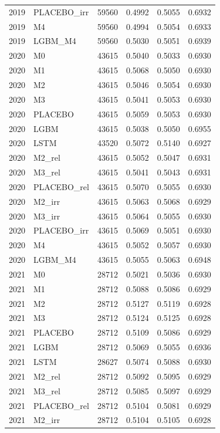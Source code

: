 \begin{tabular}{llrrrr}
2019 & PLACEBO\_irr & 59560 & 0.4992 & 0.5055 & 0.6932 \\
2019 & M4 & 59560 & 0.4994 & 0.5054 & 0.6933 \\
2019 & LGBM\_M4 & 59560 & 0.5030 & 0.5051 & 0.6939 \\
2020 & M0 & 43615 & 0.5040 & 0.5033 & 0.6930 \\
2020 & M1 & 43615 & 0.5068 & 0.5050 & 0.6930 \\
2020 & M2 & 43615 & 0.5046 & 0.5054 & 0.6930 \\
2020 & M3 & 43615 & 0.5041 & 0.5053 & 0.6930 \\
2020 & PLACEBO & 43615 & 0.5059 & 0.5053 & 0.6930 \\
2020 & LGBM & 43615 & 0.5038 & 0.5050 & 0.6955 \\
2020 & LSTM & 43520 & 0.5072 & 0.5140 & 0.6927 \\
2020 & M2\_rel & 43615 & 0.5052 & 0.5047 & 0.6931 \\
2020 & M3\_rel & 43615 & 0.5041 & 0.5043 & 0.6931 \\
2020 & PLACEBO\_rel & 43615 & 0.5070 & 0.5055 & 0.6930 \\
2020 & M2\_irr & 43615 & 0.5063 & 0.5068 & 0.6929 \\
2020 & M3\_irr & 43615 & 0.5064 & 0.5055 & 0.6930 \\
2020 & PLACEBO\_irr & 43615 & 0.5069 & 0.5051 & 0.6930 \\
2020 & M4 & 43615 & 0.5052 & 0.5057 & 0.6930 \\
2020 & LGBM\_M4 & 43615 & 0.5055 & 0.5063 & 0.6948 \\
2021 & M0 & 28712 & 0.5021 & 0.5036 & 0.6930 \\
2021 & M1 & 28712 & 0.5088 & 0.5086 & 0.6929 \\
2021 & M2 & 28712 & 0.5127 & 0.5119 & 0.6928 \\
2021 & M3 & 28712 & 0.5124 & 0.5125 & 0.6928 \\
2021 & PLACEBO & 28712 & 0.5109 & 0.5086 & 0.6929 \\
2021 & LGBM & 28712 & 0.5069 & 0.5055 & 0.6936 \\
2021 & LSTM & 28627 & 0.5074 & 0.5088 & 0.6930 \\
2021 & M2\_rel & 28712 & 0.5092 & 0.5095 & 0.6929 \\
2021 & M3\_rel & 28712 & 0.5085 & 0.5097 & 0.6929 \\
2021 & PLACEBO\_rel & 28712 & 0.5104 & 0.5081 & 0.6929 \\
2021 & M2\_irr & 28712 & 0.5104 & 0.5105 & 0.6928 \\

\end{tabular}
